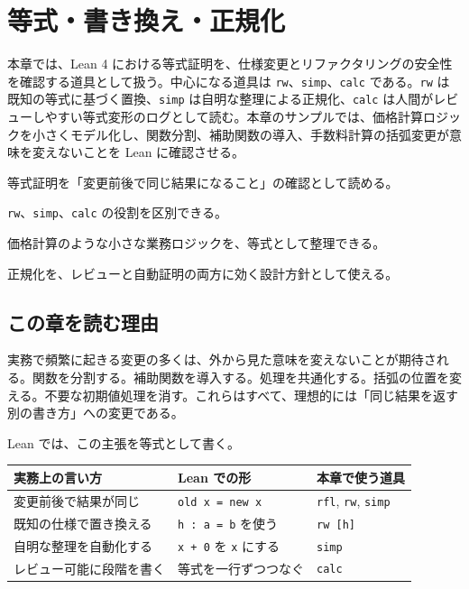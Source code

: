 \chapter{等式・書き換え・正規化}
\label{chap:ch12_equations_rewriting_normalization}

\begin{chapterabstract}
本章では、Lean 4 における等式証明を、仕様変更とリファクタリングの安全性を確認する道具として扱う。中心になる道具は \texttt{rw}、\texttt{simp}、\texttt{calc} である。\texttt{rw} は既知の等式に基づく置換、\texttt{simp} は自明な整理による正規化、\texttt{calc} は人間がレビューしやすい等式変形のログとして読む。本章のサンプルでは、価格計算ロジックを小さくモデル化し、関数分割、補助関数の導入、手数料計算の括弧変更が意味を変えないことを Lean に確認させる。
\end{chapterabstract}

\begin{learninggoals}
\item 等式証明を「変更前後で同じ結果になること」の確認として読める。
\item \texttt{rw}、\texttt{simp}、\texttt{calc} の役割を区別できる。
\item 価格計算のような小さな業務ロジックを、等式として整理できる。
\item 正規化を、レビューと自動証明の両方に効く設計方針として使える。
\end{learninggoals}

\section{この章を読む理由}

実務で頻繁に起きる変更の多くは、外から見た意味を変えないことが期待される。関数を分割する。補助関数を導入する。処理を共通化する。括弧の位置を変える。不要な初期値処理を消す。これらはすべて、理想的には「同じ結果を返す別の書き方」への変更である。

Lean では、この主張を等式として書く。

\begin{center}
\begin{tabular}{lll}
\toprule
実務上の言い方 & Lean での形 & 本章で使う道具 \\
\midrule
変更前後で結果が同じ & \texttt{old x = new x} & \texttt{rfl}, \texttt{rw}, \texttt{simp} \\
既知の仕様で置き換える & \texttt{h : a = b} を使う & \texttt{rw [h]} \\
自明な整理を自動化する & \texttt{x + 0} を \texttt{x} にする & \texttt{simp} \\
レビュー可能に段階を書く & 等式を一行ずつつなぐ & \texttt{calc} \\
\bottomrule
\end{tabular}
\end{center}

